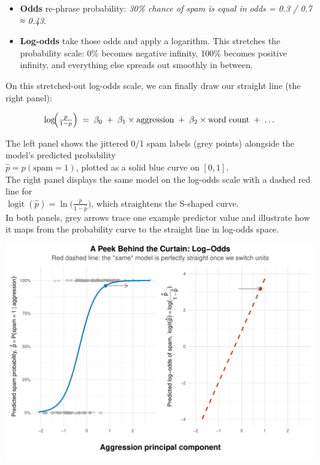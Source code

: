 \documentclass[
  letterpaper,
  DIV=11,
  numbers=noendperiod]{scrartcl}
\begin{document}
\begin{itemize}
\item
  \textbf{Odds} re-phrase probability: \emph{30\% chance of spam is
  equal in} \emph{odds = 0.3 / 0.7 ≈ 0.43}.
\item
  \textbf{Log-odds} take those odds and apply a logarithm. This
  stretches the probability scale: 0\% becomes negative infinity, 100\%
  becomes positive infinity, and everything else spreads out smoothly in
  between.
\end{itemize}

On this stretched-out log-odds scale, we can finally draw our straight
line (the right panel):

\[
\log\!\Bigl(\tfrac{p}{1-p}\Bigr)
  \;=\;
  \beta_0 \;+\; \beta_1 \times \text{aggression}
           \;+\; \beta_2 \times \text{word count}
           \;+\; \dots
\]

The left panel shows the jittered 0/1 spam labels (grey points)
alongside the model's predicted probability\\
\(\displaystyle \hat p = p(\text{spam}=1)\), plotted as a solid blue
curve on \([0,1]\).\\
The right panel displays the same model on the log-odds scale with a
dashed red line for\\
\(\displaystyle \operatorname{logit}(\hat p) = \ln\!\bigl(\tfrac{\hat p}{1-\hat p}\bigr)\),
which straightens the S-shaped curve.\\
In both panels, grey arrows trace one example predictor value and
illustrate how it maps from the probability curve to the straight line
in log-odds space.

\begin{center}
\includegraphics[width=1\linewidth,height=\textheight,keepaspectratio]{Beyond!!!_files/figure-pdf/logit-curtain-1.pdf}
\end{center}
\end{document}
